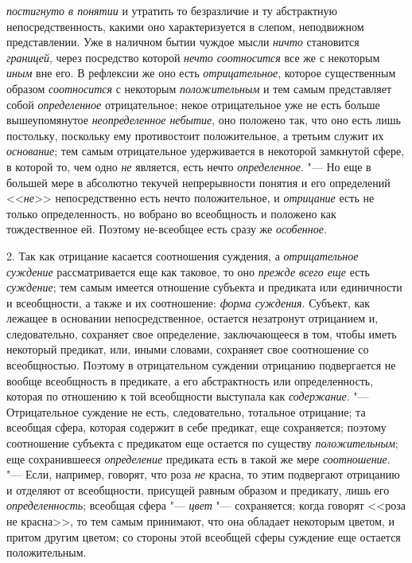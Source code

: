 {{\em постигнуто в понятии}
и утратить то безразличие и ту абстрактную
непосредственность, какими оно характеризуется в слепом, неподвижном
представлении. Уже в наличном бытии чуждое мысли
{\em ничто} становится
{\em границей}, через
посредство которой {\em нечто
соотносится} все же с некоторым
{\em иным} вне его. В
рефлексии же оно есть
{\em отрицательное},
которое существенным образом
{\em соотносится} с
некоторым {\em положительным}
и тем самым представляет собой
{\em определенное}
отрицательное; некое отрицательное уже не есть больше
вышеупомянутое {\em неопределенное
небытие}, оно положено так, что оно есть лишь постольку,
поскольку ему противостоит положительное, а третьим служит их
{\em основание}; тем
самым отрицательное удерживается в некоторой замкнутой сфере, в которой то,
чем одно {\em не}
является, есть нечто
{\em определенное}. "--- Но
еще в большей мере в абсолютно текучей непрерывности понятия и его
определений <<{\em не}>>
непосредственно есть нечто положительное, и
{\em отрицание} есть не
только определенность, но вобрано во всеобщность и положено как
тождественное ей. Поэтому не-всеобщее есть сразу же
{\em особенное}.

2. Так как отрицание касается соотношения суждения, а
{\em отрицательное суждение}
рассматривается еще как таковое, то оно
{\em прежде всего еще}
есть {\em суждение};
тем самым имеется отношение субъекта и предиката или
единичности и всеобщности, а также и их соотношение:
{\em форма суждения}.
Субъект, как лежащее в основании непосредственное, остается
незатронут отрицанием и, следовательно, сохраняет свое определение,
заключающееся в том, чтобы иметь некоторый предикат, или, иными словами,
сохраняет свое соотношение со всеобщностью. Поэтому в отрицательном
суждении отрицанию подвергается не вообще всеобщность в предикате, а его
абстрактность или определенность, которая по отношению к той всеобщности
выступала как {\em содержание}. "---
Отрицательное суждение не есть, следовательно, тотальное
отрицание; та всеобщая сфера, которая содержит в себе предикат, еще
сохраняется; поэтому соотношение субъекта с предикатом еще остается по
существу {\em положительным};
еще сохранившееся
{\em определение}
предиката есть в такой же мере
{\em соотношение}. "---
Если, например, говорят, что роза
{\em не} красна, то этим
подвергают отрицанию и отделяют от всеобщности, присущей равным образом и
предикату, лишь его
{\em определенность};
всеобщая сфера
"--- {\em цвет}
"--- сохраняется; когда говорят <<роза не красна>>, то тем самым
принимают, что она обладает некоторым цветом, и притом другим цветом; со
стороны этой всеобщей сферы суждение еще остается положительным.

}
